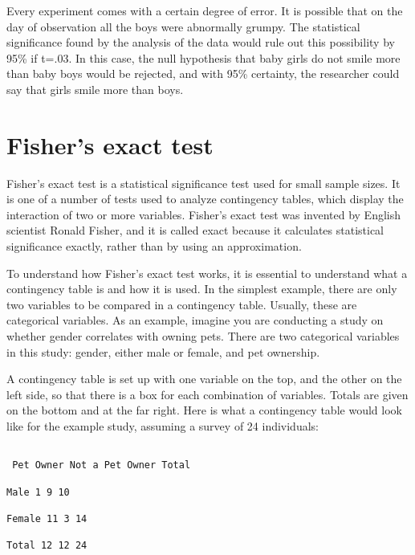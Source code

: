  

Every experiment comes with a certain degree of error. It is possible that on the day of observation all the boys were abnormally grumpy. The statistical significance found by the analysis of the data would rule out this possibility by 95\% if t=.03. In this case, the null hypothesis that baby girls do not smile more than baby boys would be rejected, and with 95\% certainty, the researcher could say that girls smile more than boys.

 





\section{Fisher's exact test}

 

Fisher's exact test is a statistical significance test used for small sample sizes. It is one of a number of tests used to analyze contingency tables, which display the interaction of two or more variables. Fisher's exact test was invented by English scientist Ronald Fisher, and it is called exact because it calculates statistical significance exactly, rather than by using an approximation.

 

To understand how Fisher's exact test works, it is essential to understand what a contingency table is and how it is used. In the simplest example, there are only two variables to be compared in a contingency table. Usually, these are categorical variables. As an example, imagine you are conducting a study on whether gender correlates with owning pets. There are two categorical variables in this study: gender, either male or female, and pet ownership.

 

A contingency table is set up with one variable on the top, and the other on the left side, so that there is a box for each combination of variables. Totals are given on the bottom and at the far right. Here is what a contingency table would look like for the example study, assuming a survey of 24 individuals:

\begin{verbatim}

 Pet Owner Not a Pet Owner Total

Male 1 9 10

Female 11 3 14

Total 12 12 24

\end{verbatim}

